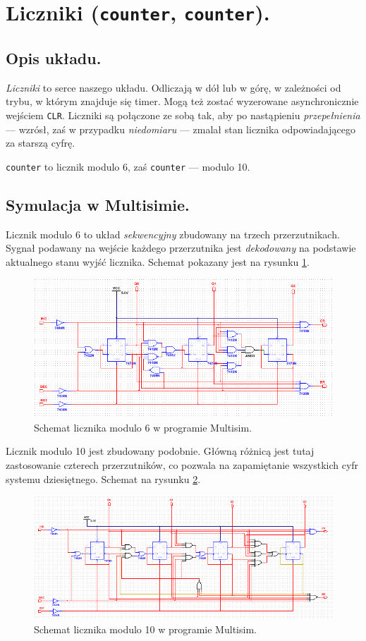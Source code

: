\documentclass[a4paper,oneside]{report}
\newcommand{\debouncer}{\texttt{debouncer}}
\newcommand{\counter}[1]{\texttt{counter\textunderscore #1}}
\begin{document}

\section{Liczniki (\counter{6}, \counter{10}).}
\subsection{Opis układu.}
\emph{Liczniki} to serce naszego układu. Odliczają w dół lub w
górę, w zależności od trybu, w którym znajduje się timer. Mogą też
zostać wyzerowane asynchronicznie wejściem \texttt{CLR}. Liczniki
są połączone ze sobą tak, aby po nastąpieniu \emph{przepełnienia}
--- wzrósł, zaś w przypadku \emph{niedomiaru} --- zmalał stan
licznika odpowiadającego za starszą cyfrę.

\counter{6} to licznik modulo 6, zaś \counter{10} --- modulo 10.
\subsection{Symulacja w Multisimie.}
Licznik modulo 6 to układ \emph{sekwencyjny} zbudowany na trzech
przerzutnikach. Sygnał podawany na wejście każdego przerzutnika jest
\emph{dekodowany} na podstawie aktualnego stanu wyjść licznika. Schemat pokazany jest na rysunku \ref{counter6_scheme}.
\begin{figure}[p]
\centering
\includegraphics[width=\textwidth]{multisim/counter6.png}
\caption[Schemat licznika modulo 6.]{Schemat licznika modulo 6 w programie Multisim.}
\label{counter6_scheme}
\end{figure}

Licznik modulo 10 jest zbudowany podobnie. Główną różnicą jest tutaj
zastosowanie czterech przerzutników, co pozwala na zapamiętanie
wszystkich cyfr systemu dziesiętnego. Schemat na rysunku
\ref{counter10_scheme}.
\begin{figure}[p]
\centering
\includegraphics[width=\textwidth]{multisim/counter10.png}
\caption[Schemat licznika modulo 10.]{Schemat licznika modulo 10 w programie Multisim.}
\label{counter10_scheme}
\end{figure}
\end{document}
